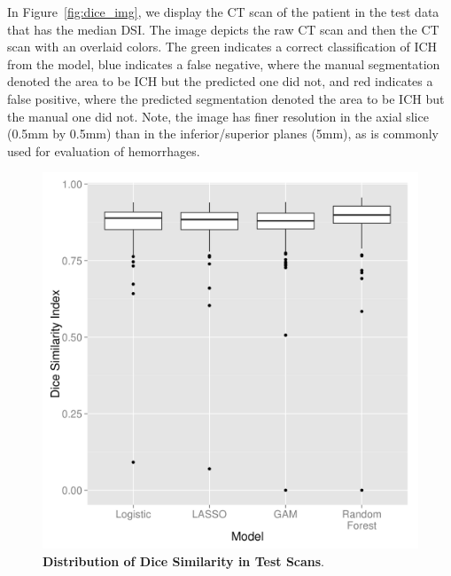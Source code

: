 \documentclass{elsarticle_nonatbib}\usepackage[]{graphicx}\usepackage[]{color}
\begin{document}
In Figure~\ref{fig:dice_img}, we display the CT scan of the patient in the test data that has the median DSI. The image depicts the raw CT scan and then the CT scan with an overlaid colors.  The green indicates a correct classification of ICH from the model, blue indicates a false negative, where the manual segmentation denoted the area to be ICH but the predicted one did not, and red indicates a false positive, where the predicted segmentation denoted the area to be ICH but the manual one did not.  Note, the image has finer resolution in the axial slice (0.5mm by 0.5mm) than in the inferior/superior planes (5mm), as is commonly used for evaluation of hemorrhages.



\begin{figure}
\centering
\includegraphics[width=0.75\linewidth,keepaspectratio]{Reseg_Dice_Comparison.png}
\caption{{\bf Distribution of Dice Similarity in Test Scans}. }
\label{fig:dice}
\end{figure}
\end{document}

